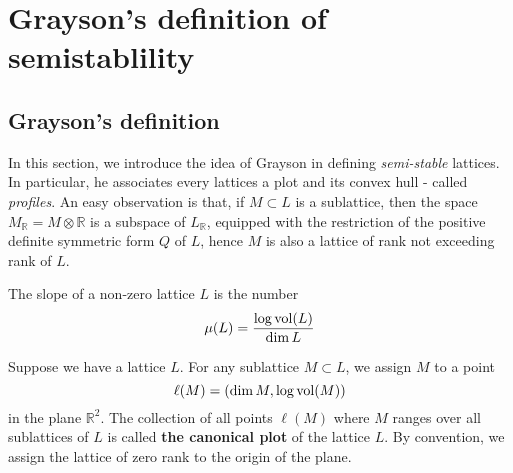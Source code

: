 \section{Grayson's definition of semistablility}
\subsection{Grayson's definition}
In this section, we introduce the idea of Grayson in defining \textit{semi-stable} lattices.
In particular, he associates every lattices a plot and its convex hull - called \textit{ profiles}.
An easy observation is that, if $M \subset L$ is a sublattice, then the space $M_\mathbb{R} = M \otimes \mathbb{R}$
is a subspace of $L_\mathbb{R}$, equipped with the restriction of the positive definite symmetric form $Q$ of $L$, hence $M$
is also a lattice of rank not exceeding rank of $L$.
\begin{definition}[\label = slope]
    The slope of a non-zero lattice $L$ is the number
    \[\mu(L) = \dfrac{\log\operatorname{vol}(L)}{\dim L}\]
\end{definition}
\begin{definition}
    Suppose we have a lattice $L$. For any sublattice $M \subset L$, we assign $M$ to a point
    \[\ell(M) = \left(\dim M, \log\operatorname{vol}(M)\right)\]
    in the plane $\mathbb{R}^2$. The collection of all points $\ell(M)$ where $M$ ranges over
    all sublattices of $L$ is called \textbf{ the canonical plot} of the lattice $L$. By convention, we assign
    the lattice of zero rank to the origin of the plane.
\end{definition}

